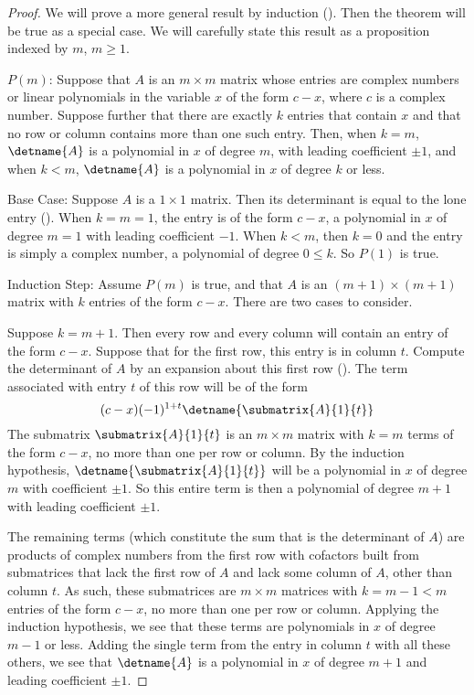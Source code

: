 \begin{proof}
We will prove a more general result by induction ().  Then the theorem will be true as a special case.  We will carefully state this result as a proposition indexed by $m$, $m\geq 1$.\par
%
$P(m)$:  Suppose that $A$ is an $m\times m$ matrix whose entries are complex numbers or linear polynomials in the variable $x$ of the form $c-x$, where $c$ is a complex number.  Suppose further that there are exactly $k$ entries that contain $x$ and that no row or column contains more than one such entry.  Then, when $k=m$, $\detname{A}$ is a polynomial in $x$ of degree $m$, with leading coefficient $\pm 1$, and when $k<m$, $\detname{A}$ is a polynomial in $x$ of degree $k$ or less.\par
%
Base Case:  Suppose $A$ is a $1\times 1$ matrix.  Then its determinant is equal to the lone entry ().  When $k=m=1$, the entry is of the form $c-x$, a polynomial in $x$ of degree $m=1$ with leading coefficient $-1$.  When $k<m$, then $k=0$ and the entry is simply a complex number, a polynomial of degree $0\leq k$.  So $P(1)$ is true.\par
%
Induction Step: Assume $P(m)$ is true, and that $A$ is an $(m+1)\times(m+1)$ matrix with $k$ entries of the form $c-x$.  There are two cases to consider.\par
%
Suppose $k=m+1$.  Then every row and every column will contain an entry of the form $c-x$.  Suppose that for the first row, this entry is in column $t$.  Compute the determinant of $A$ by an expansion about this first row ().  The term associated with entry $t$ of this row will be of the form
%
\begin{equation*}
(c-x)(-1)^{1+t}\detname{\submatrix{A}{1}{t}}
\end{equation*}
%
The submatrix $\submatrix{A}{1}{t}$ is an $m\times m$ matrix with $k=m$ terms of the form $c-x$, no more than one per row or column.  By the induction hypothesis, $\detname{\submatrix{A}{1}{t}}$ will be a polynomial in $x$ of degree $m$ with coefficient $\pm 1$.  So this entire term is then a polynomial of degree $m+1$ with leading coefficient $\pm 1$.\par
%
The remaining terms (which constitute the sum that is the determinant of $A$) are products of complex numbers from the first row with cofactors built from submatrices that lack the first row of $A$ and lack some column of $A$, other than column $t$.  As such, these submatrices are $m\times m$ matrices with $k=m-1<m$ entries of the form $c-x$, no more than one per row or column.  Applying the induction hypothesis, we see that these terms are polynomials in $x$ of degree $m-1$ or less.  Adding the single term from the entry in column $t$ with all these others, we see that $\detname{A}$ is a polynomial in $x$ of degree $m+1$ and leading coefficient $\pm 1$.\par

\end{proof}
